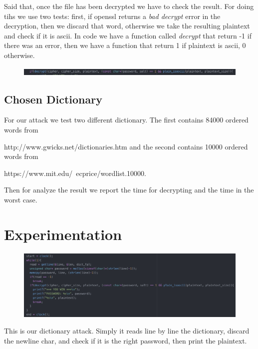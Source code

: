 \documentclass[11pt]{article}
\begin{document}
Said that, once the file has been decrypted we have to check the result. For doing tihs we use two tests: first, if openssl returns a {\em bad decrypt} error in the decryption, then we discard that word, otherwise we take the resulting plaintext and check if it is ascii. In code we have a function called {\em decrypt} that return -1 if there was an error, then we have a function that return 1 if plaintext is ascii, 0 otherwise.

\begin{figure}[!ht]
  \includegraphics[width=1\textwidth]{pic3-hw2-1635747}
  \label{fig:Ascii check}
\end{figure}

\subsection{Chosen Dictionary}
For our attack we test two different dictionary. The first contains 84000 ordered words from

http://www.gwicks.net/dictionaries.htm \newline and the second contains 10000 ordered words from

https://www.mit.edu/~ecprice/wordlist.10000.

Then for analyze the result we report the time for decrypting and the time in the worst case.

\section{Experimentation}
\begin{figure}[!ht]
  \includegraphics[width=1\textwidth]{pic4-hw2-1635747}
  \label{fig:Dictionary attack}
\end{figure}

This is our dictionary attack. Simply it reads line by line the dictionary, discard the newline char, and check if it is the right password, then print the plaintext.
\end{document}
